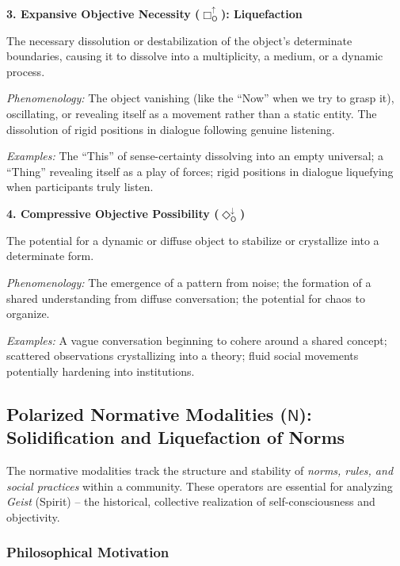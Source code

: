 \documentclass[12pt]{book}
\newcommand{\OBoxUp}{\Box_{\mathsf{O}}^{\uparrow}}
\newcommand{\ODiaDown}{\Diamond_{\mathsf{O}}^{\downarrow}}
\begin{document}
\bigskip

\noindent\textbf{3. Expansive Objective Necessity ($\OBoxUp$): Liquefaction}

The necessary dissolution or destabilization of the object's determinate boundaries, causing it to dissolve into a multiplicity, a medium, or a dynamic process.

\textit{Phenomenology:} The object vanishing (like the ``Now'' when we try to grasp it), oscillating, or revealing itself as a movement rather than a static entity. The dissolution of rigid positions in dialogue following genuine listening.

\textit{Examples:} The ``This'' of sense-certainty dissolving into an empty universal; a ``Thing'' revealing itself as a play of forces; rigid positions in dialogue liquefying when participants truly listen.

\bigskip

\noindent\textbf{4. Compressive Objective Possibility ($\ODiaDown$)}

The potential for a dynamic or diffuse object to stabilize or crystallize into a determinate form.

\textit{Phenomenology:} The emergence of a pattern from noise; the formation of a shared understanding from diffuse conversation; the potential for chaos to organize.

\textit{Examples:} A vague conversation beginning to cohere around a shared concept; scattered observations crystallizing into a theory; fluid social movements potentially hardening into institutions.

\subsection{Polarized Normative Modalities ($\mathsf{N}$): Solidification and Liquefaction of Norms}

The normative modalities track the structure and stability of \textit{norms, rules, and social practices} within a community. These operators are essential for analyzing \textit{Geist} (Spirit) -- the historical, collective realization of self-consciousness and objectivity.

\subsubsection{Philosophical Motivation}
\end{document}
